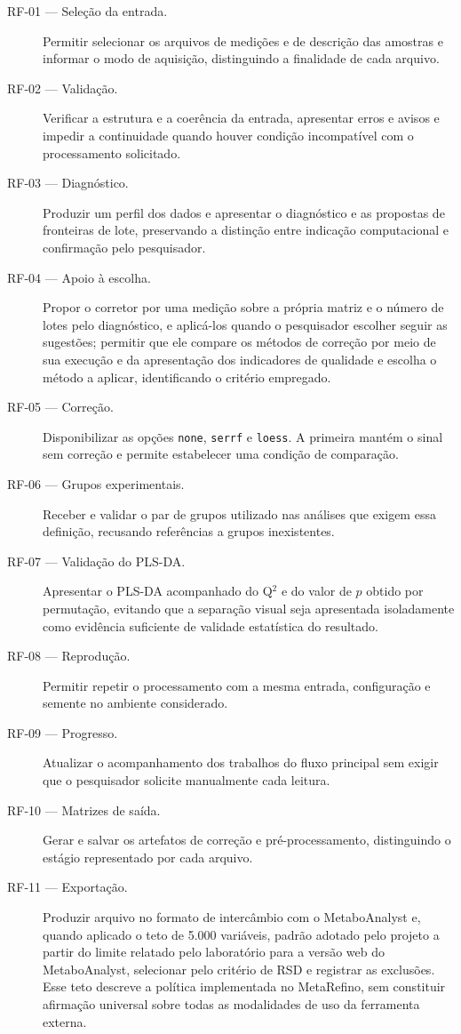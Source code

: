 \begin{description}
\item[RF-01 --- Seleção da entrada.] Permitir selecionar os arquivos de medições e de descrição das amostras e informar o modo de aquisição, distinguindo a finalidade de cada arquivo.
\item[RF-02 --- Validação.] Verificar a estrutura e a coerência da entrada, apresentar erros e avisos e impedir a continuidade quando houver condição incompatível com o processamento solicitado.
\item[RF-03 --- Diagnóstico.] Produzir um perfil dos dados e apresentar o diagnóstico e as propostas de fronteiras de lote, preservando a distinção entre indicação computacional e confirmação pelo pesquisador.
\item[RF-04 --- Apoio à escolha.] Propor o corretor por uma medição sobre a própria matriz e o número de lotes pelo diagnóstico, e aplicá-los quando o pesquisador escolher seguir as sugestões; permitir que ele compare os métodos de correção por meio de sua execução e da apresentação dos indicadores de qualidade e escolha o método a aplicar, identificando o critério empregado.
\item[RF-05 --- Correção.] Disponibilizar as opções \texttt{none}, \texttt{serrf} e \texttt{loess}. A primeira mantém o sinal sem correção e permite estabelecer uma condição de comparação.
\item[RF-06 --- Grupos experimentais.] Receber e validar o par de grupos utilizado nas análises que exigem essa definição, recusando referências a grupos inexistentes.
\item[RF-07 --- Validação do PLS-DA.] Apresentar o PLS-DA acompanhado do Q$^{2}$ e do valor de $p$ obtido por permutação, evitando que a separação visual seja apresentada isoladamente como evidência suficiente de validade estatística do resultado.
\item[RF-08 --- Reprodução.] Permitir repetir o processamento com a mesma entrada, configuração e semente no ambiente considerado.
\item[RF-09 --- Progresso.] Atualizar o acompanhamento dos trabalhos do fluxo principal sem exigir que o pesquisador solicite manualmente cada leitura.
\item[RF-10 --- Matrizes de saída.] Gerar e salvar os artefatos de correção e pré-processamento, distinguindo o estágio representado por cada arquivo.
\item[RF-11 --- Exportação.] Produzir arquivo no formato de intercâmbio com o MetaboAnalyst e, quando aplicado o teto de 5.000 variáveis, padrão adotado pelo projeto a partir do limite relatado pelo laboratório para a versão web do MetaboAnalyst, selecionar pelo critério de RSD e registrar as exclusões. Esse teto descreve a política implementada no MetaRefino, sem constituir afirmação universal sobre todas as modalidades de uso da ferramenta externa.

\end{description}
